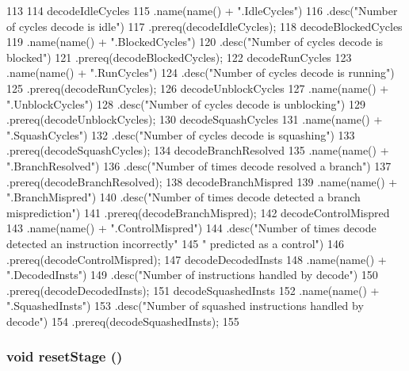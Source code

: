 \begin{DoxyCode}
113 {
114     decodeIdleCycles
115         .name(name() + ".IdleCycles")
116         .desc("Number of cycles decode is idle")
117         .prereq(decodeIdleCycles);
118     decodeBlockedCycles
119         .name(name() + ".BlockedCycles")
120         .desc("Number of cycles decode is blocked")
121         .prereq(decodeBlockedCycles);
122     decodeRunCycles
123         .name(name() + ".RunCycles")
124         .desc("Number of cycles decode is running")
125         .prereq(decodeRunCycles);
126     decodeUnblockCycles
127         .name(name() + ".UnblockCycles")
128         .desc("Number of cycles decode is unblocking")
129         .prereq(decodeUnblockCycles);
130     decodeSquashCycles
131         .name(name() + ".SquashCycles")
132         .desc("Number of cycles decode is squashing")
133         .prereq(decodeSquashCycles);
134     decodeBranchResolved
135         .name(name() + ".BranchResolved")
136         .desc("Number of times decode resolved a branch")
137         .prereq(decodeBranchResolved);
138     decodeBranchMispred
139         .name(name() + ".BranchMispred")
140         .desc("Number of times decode detected a branch misprediction")
141         .prereq(decodeBranchMispred);
142     decodeControlMispred
143         .name(name() + ".ControlMispred")
144         .desc("Number of times decode detected an instruction incorrectly"
145               " predicted as a control")
146         .prereq(decodeControlMispred);
147     decodeDecodedInsts
148         .name(name() + ".DecodedInsts")
149         .desc("Number of instructions handled by decode")
150         .prereq(decodeDecodedInsts);
151     decodeSquashedInsts
152         .name(name() + ".SquashedInsts")
153         .desc("Number of squashed instructions handled by decode")
154         .prereq(decodeSquashedInsts);
155 }
\end{DoxyCode}
\hypertarget{classDefaultDecode_ada2a699094bc420f977abf2a17ed14c8}{
\subsubsection[{resetStage}]{\setlength{\rightskip}{0pt plus 5cm}void resetStage ()}}
\label{classDefaultDecode_ada2a699094bc420f977abf2a17ed14c8}




